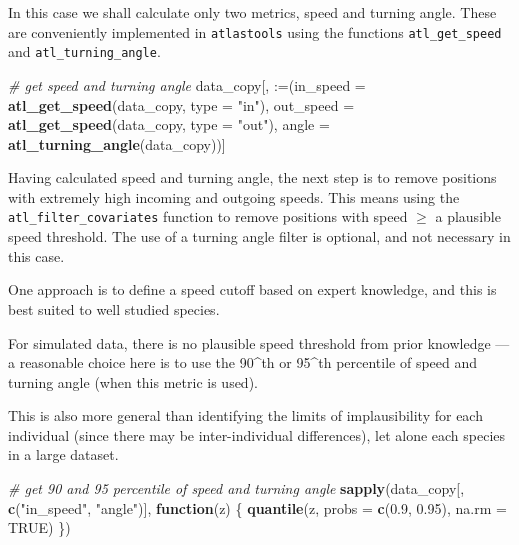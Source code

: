 \documentclass[
]{scrreprt}
\newenvironment{Shaded}{}{}
\newcommand{\CommentTok}[1]{\textcolor[rgb]{0.38,0.63,0.69}{\textit{#1}}}
\newcommand{\ControlFlowTok}[1]{\textcolor[rgb]{0.00,0.44,0.13}{\textbf{#1}}}
\newcommand{\DataTypeTok}[1]{\textcolor[rgb]{0.56,0.13,0.00}{#1}}
\newcommand{\FloatTok}[1]{\textcolor[rgb]{0.25,0.63,0.44}{#1}}
\newcommand{\KeywordTok}[1]{\textcolor[rgb]{0.00,0.44,0.13}{\textbf{#1}}}
\newcommand{\NormalTok}[1]{#1}
\newcommand{\OtherTok}[1]{\textcolor[rgb]{0.00,0.44,0.13}{#1}}
\newcommand{\StringTok}[1]{\textcolor[rgb]{0.25,0.44,0.63}{#1}}
\begin{document}
In this case we shall calculate only two metrics, speed and turning angle.
These are conveniently implemented in \texttt{atlastools} using the functions \texttt{atl\_get\_speed} and \texttt{atl\_turning\_angle}.

\begin{Shaded}
\begin{Highlighting}[]
\CommentTok{\# get speed and turning angle}
\NormalTok{data\_copy[, }\StringTok{\textasciigrave{}}\DataTypeTok{:=}\StringTok{\textasciigrave{}}\NormalTok{(}\DataTypeTok{in\_speed =} \KeywordTok{atl\_get\_speed}\NormalTok{(data\_copy,}
                                          \DataTypeTok{type =} \StringTok{"in"}\NormalTok{),}
                 \DataTypeTok{out\_speed =} \KeywordTok{atl\_get\_speed}\NormalTok{(data\_copy,}
                                           \DataTypeTok{type =} \StringTok{"out"}\NormalTok{),}
                 \DataTypeTok{angle =} \KeywordTok{atl\_turning\_angle}\NormalTok{(data\_copy))]}
\end{Highlighting}
\end{Shaded}

Having calculated speed and turning angle, the next step is to remove positions with extremely high incoming and outgoing speeds. This means using the \texttt{atl\_filter\_covariates} function to remove positions with speed \(\geq\) a plausible speed threshold. The use of a turning angle filter is optional, and not necessary in this case.

One approach is to define a speed cutoff based on expert knowledge, and this is best suited to well studied species.

For simulated data, there is no plausible speed threshold from prior knowledge --- a reasonable choice here is to use the 90\^{}th or 95\^{}th percentile of speed and turning angle (when this metric is used).

This is also more general than identifying the limits of implausibility for each individual (since there may be inter-individual differences), let alone each species in a large dataset.

\begin{Shaded}
\begin{Highlighting}[]
\CommentTok{\# get 90 and 95 percentile of speed and turning angle}
\KeywordTok{sapply}\NormalTok{(data\_copy[, }\KeywordTok{c}\NormalTok{(}\StringTok{"in\_speed"}\NormalTok{, }\StringTok{"angle"}\NormalTok{)], }\ControlFlowTok{function}\NormalTok{(z) \{}
  \KeywordTok{quantile}\NormalTok{(z, }\DataTypeTok{probs =} \KeywordTok{c}\NormalTok{(}\FloatTok{0.9}\NormalTok{, }\FloatTok{0.95}\NormalTok{), }\DataTypeTok{na.rm =} \OtherTok{TRUE}\NormalTok{)}
\NormalTok{\})}
\end{Highlighting}
\end{Shaded}
\end{document}
